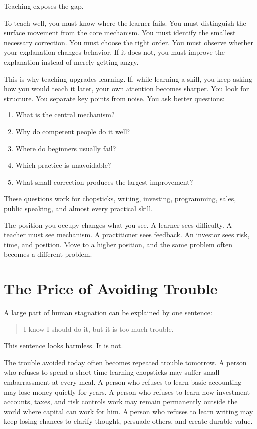 Teaching exposes the gap.

To teach well, you must know where the learner fails. You must distinguish the surface movement from the core mechanism. You must identify the smallest necessary correction. You must choose the right order. You must observe whether your explanation changes behavior. If it does not, you must improve the explanation instead of merely getting angry.

This is why teaching upgrades learning. If, while learning a skill, you keep asking how you would teach it later, your own attention becomes sharper. You look for structure. You separate key points from noise. You ask better questions:

\begin{enumerate}
\item What is the central mechanism?
\item Why do competent people do it well?
\item Where do beginners usually fail?
\item Which practice is unavoidable?
\item What small correction produces the largest improvement?
\end{enumerate}

These questions work for chopsticks, writing, investing, programming, sales, public speaking, and almost every practical skill.

The position you occupy changes what you see. A learner sees difficulty. A teacher must see mechanism. A practitioner sees feedback. An investor sees risk, time, and position. Move to a higher position, and the same problem often becomes a different problem.

\section*{The Price of Avoiding Trouble}

A large part of human stagnation can be explained by one sentence:

\begin{quote}
I know I should do it, but it is too much trouble.
\end{quote}

This sentence looks harmless. It is not.

The trouble avoided today often becomes repeated trouble tomorrow. A person who refuses to spend a short time learning chopsticks may suffer small embarrassment at every meal. A person who refuses to learn basic accounting may lose money quietly for years. A person who refuses to learn how investment accounts, taxes, and risk controls work may remain permanently outside the world where capital can work for him. A person who refuses to learn writing may keep losing chances to clarify thought, persuade others, and create durable value.

